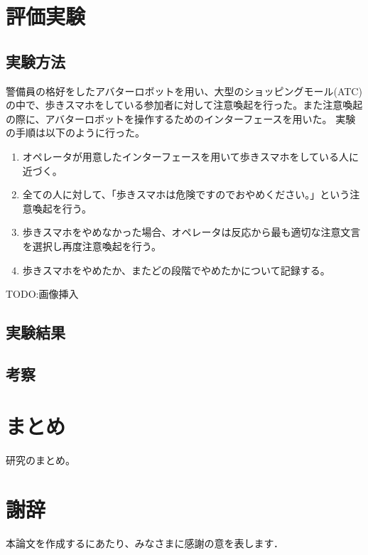 \documentclass{kuisthesis}
\begin{document}


\chapter{評価実験}
\section{実験方法}
警備員の格好をしたアバターロボットを用い、大型のショッピングモール(ATC)の中で、歩きスマホをしている参加者に対して注意喚起を行った。また注意喚起の際に、アバターロボットを操作するためのインターフェースを用いた。
実験の手順は以下のように行った。
\begin{enumerate}
  \item オペレータが用意したインターフェースを用いて歩きスマホをしている人に近づく。
  \item 全ての人に対して、「歩きスマホは危険ですのでおやめください。」という注意喚起を行う。
  \item 歩きスマホをやめなかった場合、オペレータは反応から最も適切な注意文言を選択し再度注意喚起を行う。
  \item 歩きスマホをやめたか、またどの段階でやめたかについて記録する。
\end{enumerate}
TODO:画像挿入
\section{実験結果}
\section{考察}

\chapter{まとめ}
研究のまとめ。

\chapter*{謝辞} %
本論文を作成するにあたり、みなさまに感謝の意を表します．


\renewcommand{\bibname}{参考文献} %
\end{document}
